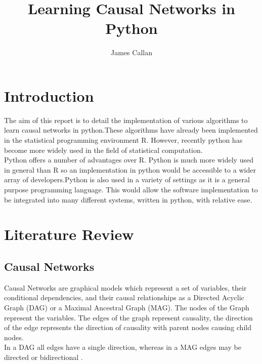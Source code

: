 \documentclass{article}
\begin{document}
\title{Learning Causal Networks in Python}
\author{James Callan}
\date{}

\maketitle

\newpage


\section{Introduction}
The aim of this report is to detail the implementation of various algorithms to learn causal networks in python.These algorithms have already been implemented in the statistical programming environment R. However, recently python has become more widely used in the field of statistical computation.\\

Python offers a number of advantages over R. Python is much more widely used in general than R so an implementation in python would be accessible to a wider array of developers.Python is also used in a variety of settings as it is a general purpose programming language. This would allow the software implementation to be integrated into many different systems, written in python, with relative ease.\\

\section{Literature Review}

\subsection{Causal Networks}

Causal Networks are graphical models which represent a set of variables, their conditional dependencies, and their causal relationships\cite{verma1990causal} as a Directed Acyclic Graph (DAG) or a Maximal Ancestral Graph (MAG). The nodes of the Graph represent the variables. The edges of the graph represent causality, the direction of the edge represents the direction of causality with parent nodes causing child nodes\cite{verma1990causal}. 
\\

In a DAG all edges have a single direction, whereas in a MAG edges may be directed or bidirectional \cite{zhang2008causal}.
\\
\end{document}
